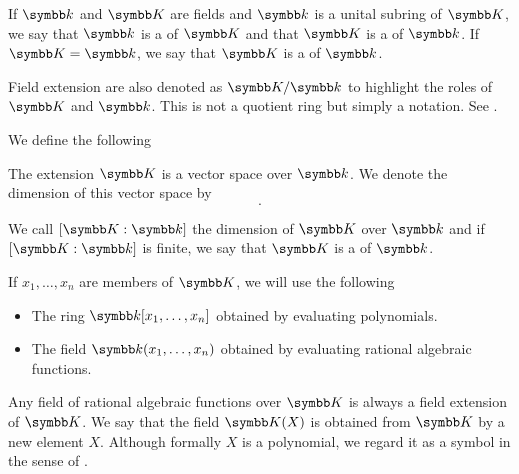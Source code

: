 \begin{definition}\label{def:field_extension}
  If \( \Bk \) and \( \BK \) are fields and \( \Bk \) is a unital subring of \( \BK \), we say that \( \Bk \) is a  of \( \BK \) and that \( \BK \) is a  of \( \Bk \). If \( \BK = \Bk \), we say that \( \BK \) is a  of \( \Bk \).

  Field extension are also denoted as \( \BK / \Bk \) to highlight the roles of \( \BK \) and \( \Bk \). This is not a quotient ring but simply a notation. See .

  We define the following
  \begin{defenum}
     The extension \( \BK \) is a vector space over \( \Bk \). We denote the dimension of this vector space by
    \begin{equation*}
      [\BK : \Bk].
    \end{equation*}

    We call \( [\BK : \Bk] \) the dimension of \( \BK \) over \( \Bk \) and if \( [\BK : \Bk] \) is finite, we say that \( \BK \) is a  of \( \Bk \).

     If \( x_1, \ldots, x_n \) are members of \( \BK \), we will use the following 
    \begin{itemize}
      \item The ring \( \Bk[x_1, \ldots, x_n] \) obtained by evaluating polynomials.
      \item The field \( \Bk(x_1, \ldots, x_n) \) obtained by evaluating rational algebraic functions.
    \end{itemize}
  \end{defenum}
\end{definition}

\begin{remark}\label{remark:adjoint_extension_field}
  Any field of rational algebraic functions over \( \BK \) is always a field extension of \( \BK \). We say that the field \( \BK(X) \) is obtained from \( \BK \) by  a new element \( X \). Although formally \( X \) is a polynomial, we regard it as a symbol in the sense of .
\end{remark}

